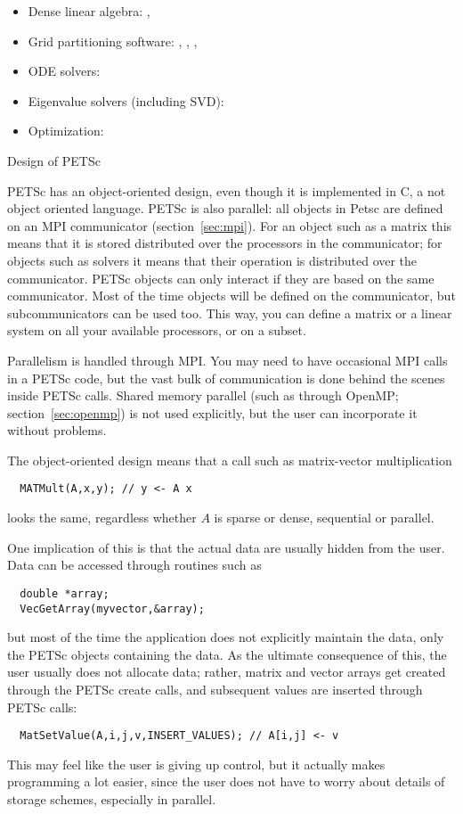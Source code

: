   \begin{itemize}
  \item Dense linear algebra: , 
  \item Grid partitioning software: , , , 
  \item ODE solvers: 
  \item Eigenvalue solvers (including SVD): 
  \item Optimization: 
  \end{itemize}

 {Design of PETSc}

PETSc has an object-oriented design, even though it is implemented in
C, a not object oriented language. PETSc is also parallel: all objects
in Petsc are defined on an MPI communicator
(section~\ref{sec:mpi}). For an object such as a matrix this means
that it is stored distributed over the processors in the communicator;
for objects such as solvers it means that their operation is
distributed over the communicator.  PETSc objects can only interact if
they are based on the same communicator.  Most of the time objects
will be defined on the  communicator, but
subcommunicators can be used too. This way, you can define a matrix or
a linear system on all your available processors, or on a subset.

Parallelism is handled through MPI. You may need to have occasional
MPI calls in a PETSc code, but the vast bulk of communication is done
behind the scenes inside PETSc calls. Shared memory parallel (such as
through OpenMP; section~\ref{sec:openmp}) is not used explicitly, but
the user can incorporate it without problems.

The object-oriented design means that a call such as matrix-vector
multiplication
\begin{verbatim}
  MATMult(A,x,y); // y <- A x
\end{verbatim}
looks the same, regardless whether $A$ is sparse or dense, sequential
or parallel.

One implication of this is that the actual data are usually hidden from
the user. Data can be accessed through routines such as
\begin{verbatim}
  double *array;
  VecGetArray(myvector,&array); 
\end{verbatim}
but most of the time the application does not explicitly maintain the
data, only the PETSc objects containing the data. As the ultimate consequence
of this, the user usually does not allocate data; rather, matrix and vector
arrays get created through the PETSc create calls, and subsequent
values are inserted through PETSc calls:
\begin{verbatim}
  MatSetValue(A,i,j,v,INSERT_VALUES); // A[i,j] <- v
\end{verbatim}
This may feel like the user is giving up control, but it actually
makes programming a lot easier, since the user does not have to worry
about details of storage schemes, especially in parallel.

